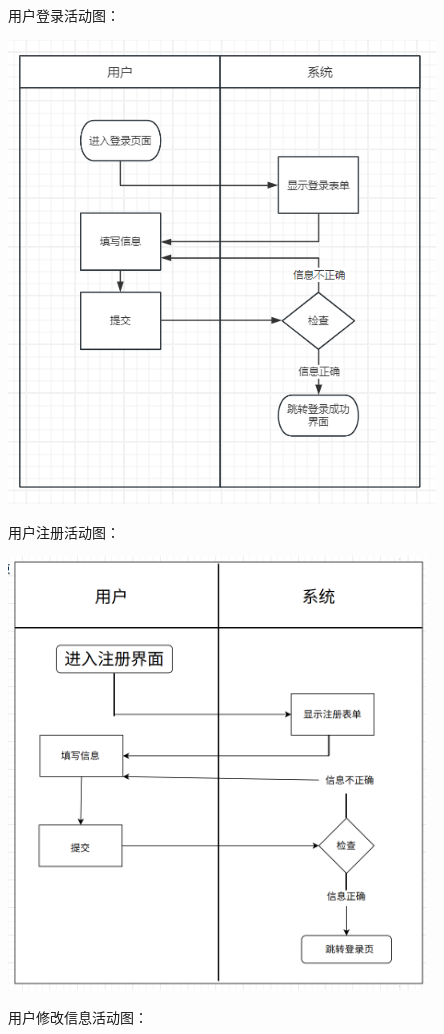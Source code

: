 \documentclass[]{article}
\begin{document}
用户登录活动图：

\includegraphics[width=4.45694in,height=4.83819in]{media/media/image1.png}

用户注册活动图：

\includegraphics[width=4.35278in,height=4.51458in]{media/media/image2.png}

用户修改信息活动图：
\end{document}
